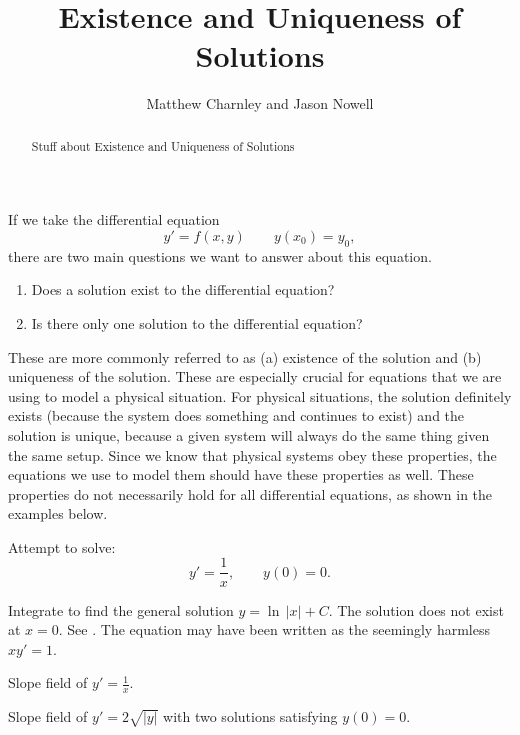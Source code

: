 \documentclass{ximera}
\title{Existence and Uniqueness of Solutions}
\author{Matthew Charnley and Jason Nowell}
\begin{document}
\begin{abstract}
    Stuff about Existence and Uniqueness of Solutions
\end{abstract}
\maketitle

\label{existunique:section}


If we take the differential equation
\[ 
    y' = f(x,y) \qquad y(x_0) = y_0, 
\] 
there are two main questions we want to answer about this equation.

\begin{enumerate}%
    \item Does a solution exist to the differential equation?
    \item Is there only one solution to the differential equation?
\end{enumerate}

These are more commonly referred to as (a) existence of the solution and (b) uniqueness of the solution. These are especially crucial for equations that we are using to model a physical situation. For physical situations, the solution definitely exists (because the system does something and continues to exist) and the solution is unique, because a given system will always do the same thing given the same setup. Since we know that physical systems obey these properties, the equations we use to model them should have these properties as well. These properties do not necessarily hold for all differential equations, as shown in the examples below. 

\begin{example}
    Attempt to solve:
    \begin{equation*}
        y' = \frac{1}{x}, \qquad y(0) = 0 .
    \end{equation*}
    
    Integrate to find the general solution $y = \ln \, \lvert x \rvert + C$.  The solution does not exist at $x=0$.  See . The equation may have been written as the seemingly harmless $x y' = 1$.
    
    \begin{myfig}
        \parbox[t]{3in}{
         \capstart
         \caption{Slope field of $y' = \frac{1}{x}$.\label{1.3:xinvfig}}
        }
        \quad
        \parbox[t]{3in}{
         \capstart
         \caption{Slope field of $y' = 2 \sqrt{\lvert y \rvert}$ with two solutions satisfying $y(0) = 0$.\label{1.3:sqrtfig}}
        }
    \end{myfig}
\end{example}
\end{document}
